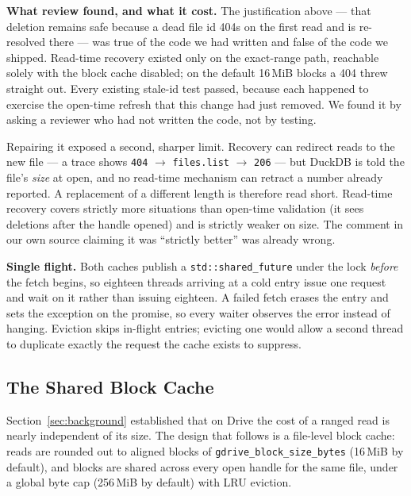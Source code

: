 \documentclass[sigconf, nonacm]{acmart}
\begin{document}
\textbf{What review found, and what it cost.} The justification above --- that
deletion remains safe because a dead file id 404s on the first read and is
re-resolved there --- was true of the code we had written and false of the code
we shipped. Read-time recovery existed only on the exact-range path, reachable
solely with the block cache disabled; on the default 16\,MiB blocks a 404 threw
straight out. Every existing stale-id test passed, because each happened to
exercise the open-time refresh that this change had just removed. We found it
by asking a reviewer who had not written the code, not by testing.

Repairing it exposed a second, sharper limit. Recovery can redirect reads to
the new file --- a trace shows \texttt{404} $\rightarrow$ \texttt{files.list}
$\rightarrow$ \texttt{206} --- but DuckDB is told the file's \emph{size} at
open, and no read-time mechanism can retract a number already reported. A
replacement of a different length is therefore read short. Read-time recovery
covers strictly more situations than open-time validation (it sees deletions
after the handle opened) and is strictly weaker on size. The comment in our own
source claiming it was ``strictly better'' was already wrong.

\textbf{Single flight.}
Both caches publish a \texttt{std::shared\_future} under the lock \emph{before}
the fetch begins, so eighteen threads arriving at a cold entry issue one
request and wait on it rather than issuing eighteen. A failed fetch erases the
entry and sets the exception on the promise, so every waiter observes the
error instead of hanging. Eviction skips in-flight entries; evicting one would
allow a second thread to duplicate exactly the request the cache exists to
suppress.

\subsection{The Shared Block Cache}
\label{sec:blockcache}

Section~\ref{sec:background} established that on Drive the cost of a ranged
read is nearly independent of its size. The design that follows is a
file-level block cache: reads are rounded out to aligned blocks of
\texttt{gdrive\_block\_size\_bytes} (16\,MiB by default), and blocks are
shared across every open handle for the same file, under a global byte cap
(256\,MiB by default) with LRU eviction.
\end{document}
